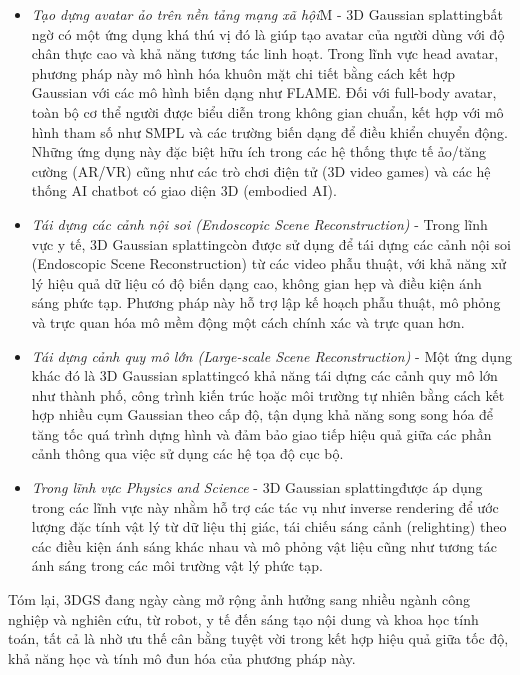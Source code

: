 \begin{itemize}
        \item \textit{Tạo dựng avatar ảo trên nền tảng mạng xã hội}M - 3D Gaussian splattingbất ngờ có một ứng dụng khá thú vị đó là giúp tạo avatar của người dùng với độ chân thực cao và khả năng tương tác linh hoạt. Trong lĩnh vực head avatar, phương pháp này mô hình hóa khuôn mặt chi tiết bằng cách kết hợp Gaussian với các mô hình biến dạng như FLAME. Đối với full-body avatar, toàn bộ cơ thể người được biểu diễn trong không gian chuẩn, kết hợp với mô hình tham số như SMPL và các trường biến dạng để điều khiển chuyển động. Những ứng dụng này đặc biệt hữu ích trong các hệ thống thực tế ảo/tăng cường (AR/VR) cũng như các trò chơi điện tử (3D video games) và các hệ thống AI chatbot có giao diện 3D (embodied AI).\\
        
        \item \textit{Tái dựng các cảnh nội soi (Endoscopic Scene Reconstruction)} - Trong lĩnh vực y tế, 3D Gaussian splattingcòn được sử dụng để tái dựng các cảnh nội soi (Endoscopic Scene Reconstruction) từ các video phẫu thuật, với khả năng xử lý hiệu quả dữ liệu có độ biến dạng cao, không gian hẹp và điều kiện ánh sáng phức tạp. Phương pháp này hỗ trợ lập kế hoạch phẫu thuật, mô phỏng và trực quan hóa mô mềm động một cách chính xác và trực quan hơn.\\
        
        \item \textit{Tái dựng cảnh quy mô lớn (Large-scale Scene Reconstruction)} - Một ứng dụng khác đó là 3D Gaussian splattingcó khả năng tái dựng các cảnh quy mô lớn như thành phố, công trình kiến trúc hoặc môi trường tự nhiên bằng cách kết hợp nhiều cụm Gaussian theo cấp độ, tận dụng khả năng song song hóa để tăng tốc quá trình dựng hình và đảm bảo giao tiếp hiệu quả giữa các phần cảnh thông qua việc sử dụng các hệ tọa độ cục bộ.\\
        
        \item \textit{Trong lĩnh vực Physics and Science} - 3D Gaussian splattingđược áp dụng trong các lĩnh vực này nhằm hỗ trợ các tác vụ như inverse rendering để ước lượng đặc tính vật lý từ dữ liệu thị giác, tái chiếu sáng cảnh (relighting) theo các điều kiện ánh sáng khác nhau và mô phỏng vật liệu cũng như tương tác ánh sáng trong các môi trường vật lý phức tạp.

        \end{itemize}
        \medskip
        
        Tóm lại, 3DGS đang ngày càng mở rộng ảnh hưởng sang nhiều ngành công nghiệp và nghiên cứu, từ robot, y tế đến sáng tạo nội dung và khoa học tính toán, tất cả là nhờ ưu thế cân bằng tuyệt vời trong kết hợp hiệu quả giữa tốc độ, khả năng học và tính mô đun hóa của phương pháp này.
\newpage
